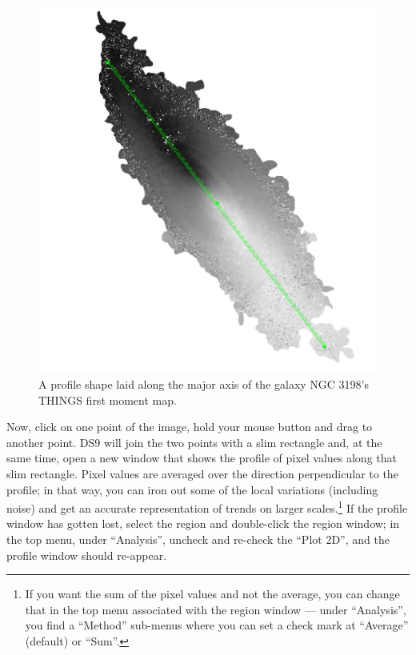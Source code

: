 \documentclass[twocolumn,apj]{openjournal}
\begin{document}
\begin{figure}[htbp]
\begin{center}
\includegraphics[width=\linewidth]{ngc-profile.jpg}
\caption{A profile shape laid along the major axis of the galaxy NGC 3198's THINGS first moment map.}
\label{ProfileNGC}
\end{center}
\end{figure}
Now, click on one point of the image, hold your mouse button and drag to another point. DS9 will join the two points with a slim rectangle and, at the same time, open a new window that shows the profile of pixel values along that slim rectangle. Pixel values are averaged over the direction perpendicular to the profile; in that way, you can iron out some of the local variations (including noise) and get an accurate representation of trends on larger scales.\footnote{If you want the sum of the pixel values and not the average, you can change that in the top menu associated with the region window --- under ``Analysis'', you find a ``Method'' sub-menus where you can set a check mark at ``Average'' (default) or ``Sum''.} If the profile window has gotten lost, select the region and double-click the region window; in the top menu, under ``Analysis'', uncheck and re-check the ``Plot 2D'', and the profile window should re-appear.
\end{document}
